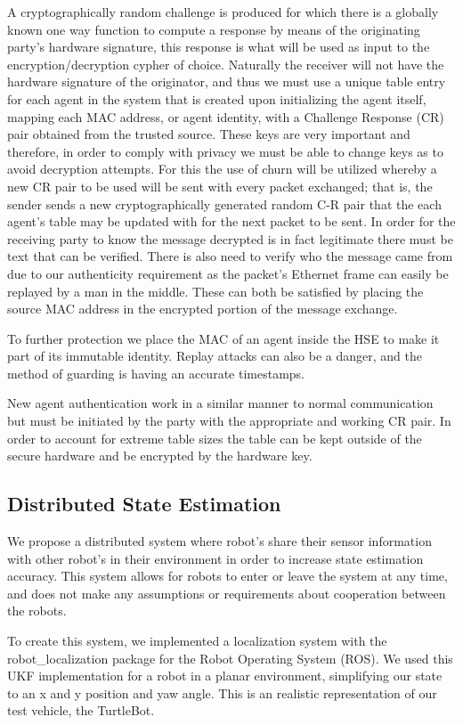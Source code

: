 \documentclass[conference]{IEEEtran}
\begin{document}
A cryptographically random challenge is produced for which there is a globally known one way function to compute a response by means of the originating party's hardware signature, this response is what will be used as input to the encryption/decryption cypher of choice. Naturally the receiver will not have the hardware signature of the originator, and thus we must use a unique table entry for each agent in the system that is created upon initializing the agent itself, mapping each MAC address, or agent identity, with a Challenge Response (CR) pair obtained from the trusted source. These keys are very important and therefore, in order to comply with privacy we must be able to change keys as to avoid decryption attempts. For this the use of churn will be utilized whereby a new CR pair to be used will be sent with every packet exchanged; that is, the sender sends a new cryptographically generated random C-R pair that the each agent's table may be updated with for the next packet to be sent. In order for the receiving party to know the message decrypted is in fact legitimate there must be text that can be verified. There is also need to verify who the message came from due to our authenticity requirement as the packet's Ethernet frame can easily be replayed by a man in the middle. These can both be satisfied by placing the source MAC address in the encrypted portion of the message exchange. 

To further protection we place the MAC of an agent inside the HSE to make it part of its immutable identity. Replay attacks can also be a danger, and the method of guarding is having an accurate timestamps.
	
New agent authentication work in a similar manner to normal communication but must be initiated by the party with the appropriate and working CR pair. In order to account for extreme table sizes the table can be kept outside of the secure hardware and be encrypted by the hardware key.

\subsection{Distributed State Estimation}
We propose a distributed system where robot's share their sensor information with other robot's in their environment in order to increase state estimation accuracy. This system allows for robots to enter or leave the system at any time, and does not make any assumptions or requirements about cooperation between the robots.

To create this system, we implemented a localization system with the robot\_localization \cite{Moore2014, Moore} package for the Robot Operating System (ROS). We used this UKF implementation for a robot in a planar environment, simplifying our state to an x and y position and yaw angle. This is an realistic representation of our test vehicle, the TurtleBot.
 
\end{document}
